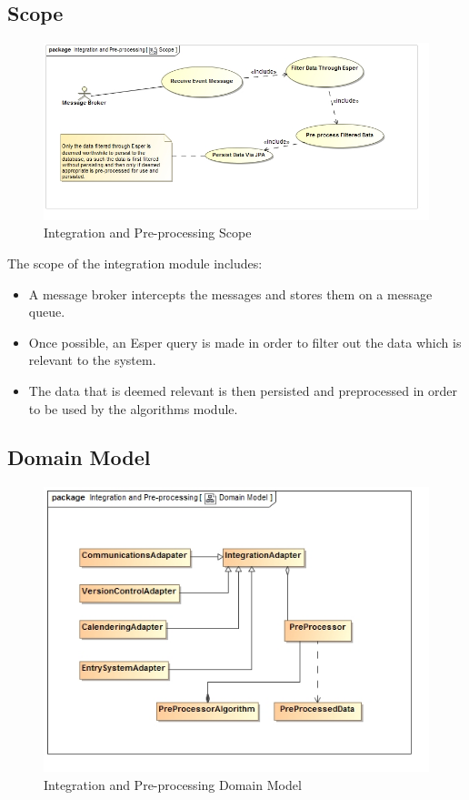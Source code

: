 \documentclass[11pt,a4paper]{article}
\begin{document}
\subsection{Scope}
\begin{figure}[H]
	\begin{center}
		\includegraphics[scale=0.6]{../Images/Integration_Scope.jpg}
		\caption{Integration and Pre-processing Scope}
	\end{center}
\end{figure}
The scope of the integration module includes:
\begin{itemize}
	\item A message broker intercepts the messages and stores them on a message queue.
	\item Once possible, an Esper query is made in order to filter out the data which is relevant to the system.
	\item The data that is deemed relevant is then persisted and preprocessed in order to be used by the algorithms module.
\end{itemize}

\subsection{Domain Model}
\begin{figure}[H]
	\begin{center}
		\includegraphics[scale=0.75]{../Images/Integration_Domain.jpg}
		\caption{Integration and Pre-processing Domain Model}
	\end{center}
\end{figure}
\end{document}
